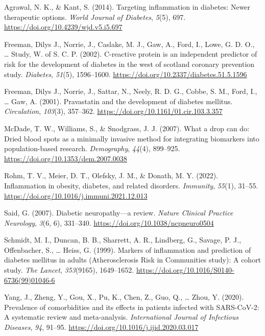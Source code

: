 \documentclass[
  man,floatsintext]{apa6}
\newlength{\cslhangindent}
\newlength{\cslentryspacingunit} %
\newenvironment{CSLReferences}[2] %
 {%
  \setlength{\parindent}{0pt}
  \ifodd #1
  \let\oldpar\par
  \def\par{\hangindent=\cslhangindent\oldpar}
  \fi
  \setlength{\parskip}{#2\cslentryspacingunit}
 }%
 {}
\begin{document}
\hypertarget{refs}{}
\begin{CSLReferences}{1}{0}
\leavevmode{}%
Agrawal, N. K., \& Kant, S. (2014). Targeting inflammation in diabetes: {Newer} therapeutic options. \emph{World Journal of Diabetes}, \emph{5}(5), 697. \url{https://doi.org/10.4239/wjd.v5.i5.697}

\leavevmode{}%
Freeman, Dilys J., Norrie, J., Caslake, M. J., Gaw, A., Ford, I., Lowe, G. D. O., \ldots{} Study, W. of S. C. P. (2002). C-reactive protein is an independent predictor of risk for the development of diabetes in the west of scotland coronary prevention study. \emph{Diabetes}, \emph{51}(5), 1596--1600. \url{https://doi.org/10.2337/diabetes.51.5.1596}

\leavevmode{}%
Freeman, Dilys J., Norrie, J., Sattar, N., Neely, R. D. G., Cobbe, S. M., Ford, I., \ldots{} Gaw, A. (2001). Pravastatin and the development of diabetes mellitus. \emph{Circulation}, \emph{103}(3), 357--362. \url{https://doi.org/10.1161/01.cir.103.3.357}

\leavevmode{}%
McDade, T. W., Williams, S., \& Snodgrass, J. J. (2007). What a drop can do: {Dried} blood spots as a minimally invasive method for integrating biomarkers into population-based research. \emph{Demography}, \emph{44}(4), 899--925. \url{https://doi.org/10.1353/dem.2007.0038}

\leavevmode{}%
Rohm, T. V., Meier, D. T., Olefsky, J. M., \& Donath, M. Y. (2022). Inflammation in obesity, diabetes, and related disorders. \emph{Immunity}, \emph{55}(1), 31--55. \url{https://doi.org/10.1016/j.immuni.2021.12.013}

\leavevmode{}%
Said, G. (2007). Diabetic neuropathy---a review. \emph{Nature Clinical Practice Neurology}, \emph{3}(6, 6), 331--340. \url{https://doi.org/10.1038/ncpneuro0504}

\leavevmode{}%
Schmidt, M. I., Duncan, B. B., Sharrett, A. R., Lindberg, G., Savage, P. J., Offenbacher, S., \ldots{} Heiss, G. (1999). Markers of inflammation and prediction of diabetes mellitus in adults ({Atherosclerosis Risk} in {Communities} study): A cohort study. \emph{The Lancet}, \emph{353}(9165), 1649--1652. \url{https://doi.org/10.1016/S0140-6736(99)01046-6}

\leavevmode{}%
Yang, J., Zheng, Y., Gou, X., Pu, K., Chen, Z., Guo, Q., \ldots{} Zhou, Y. (2020). Prevalence of comorbidities and its effects in patients infected with {SARS-CoV-2}: A systematic review and meta-analysis. \emph{International Journal of Infectious Diseases}, \emph{94}, 91--95. \url{https://doi.org/10.1016/j.ijid.2020.03.017}

\end{CSLReferences}


\clearpage
\renewcommand{\listfigurename}{Figure captions}

\clearpage
\renewcommand{\listtablename}{Table captions}
\end{document}
